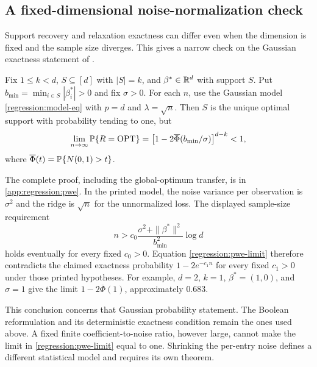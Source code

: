\subsection{A fixed-dimensional noise-normalization check}
\label{regression:pwe}

Support recovery and relaxation exactness can differ even when the
dimension is fixed and the sample size diverges. This gives a narrow
check on the Gaussian exactness statement of
\citet[Section~3.1, Theorem~2, p.~72]{pilanciWainwrightElGhaoui2015BooleanRelaxation}.

\begin{theorem}
\label{regression:pwe-theorem}
Fix $1\leq k<d$, $S\subseteq[d]$ with $|S|=k$, and
$\beta^*\in\mathbb{R}^d$ with support $S$. Put
$b_{\min}=\min_{i\in S}|\beta_i^*|>0$ and fix $\sigma>0$.
For each $n$, use the Gaussian model \eqref{regression:model-eq}
with $p=d$ and $\lambda=\sqrt n$. Then $S$ is the unique optimal
support with probability tending to one, but
\begin{equation}\label{regression:pwe-limit}
 \lim_{n\to\infty}\mathbb{P}\{R=\operatorname{OPT}\}
 =\left[1-2\overline\Phi(b_{\min}/\sigma)\right]^{d-k}<1,
\end{equation}
where $\overline\Phi(t)=\mathbb{P}\{N(0,1)>t\}$.
\end{theorem}

The complete proof, including the global-optimum transfer, is in
\cref{app:regression:pwe}. In the printed model, the noise variance
per observation is $\sigma^2$ and the ridge is $\sqrt n$ for the
unnormalized loss. The displayed sample-size requirement
\begin{equation}\label{regression:pwe-condition}
 n>c_0\frac{\sigma^2+\|\beta^*\|^2}{b_{\min}^2}\log d
\end{equation}
holds eventually for every fixed $c_0>0$. Equation
\eqref{regression:pwe-limit} therefore contradicts the claimed
exactness probability $1-2e^{-c_1n}$ for every fixed $c_1>0$
under those printed hypotheses. For example, $d=2$, $k=1$,
$\beta^*=(1,0)$, and $\sigma=1$ give the limit
$1-2\overline\Phi(1)$, approximately $0.683$.

This conclusion concerns that Gaussian probability statement. The
Boolean reformulation and its deterministic exactness condition remain
the ones used above. A fixed finite coefficient-to-noise ratio, however
large, cannot make the limit in \eqref{regression:pwe-limit} equal to
one. Shrinking the per-entry noise defines a different statistical
model and requires its own theorem.
